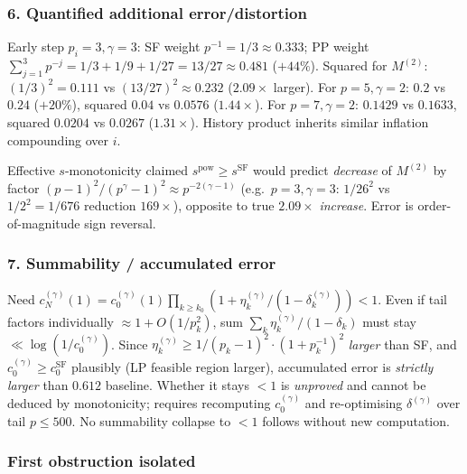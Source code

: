 \documentclass[11pt,a4paper]{article}
\theoremstyle{plain}
\theoremstyle{definition}
\theoremstyle{remark}
\newcommand{\cN}{c_{N}}
\newcommand{\cO}{c_{0}}
\begin{document}
\subsubsection*{6. Quantified additional error/distortion}

Early step $p_{i}=3,\gamma=3$: SF weight $p^{-1}=1/3\approx0.333$; PP weight $\sum_{j=1}^{3}p^{-j}=1/3+1/9+1/27=13/27\approx0.481$ ($+44\%$). Squared for $M^{(2)}$: $(1/3)^{2}=0.111$ vs $(13/27)^{2}\approx0.232$ ($2.09\times$ larger). For $p=5,\gamma=2$: $0.2$ vs $0.24$ ($+20\%$), squared $0.04$ vs $0.0576$ ($1.44\times$). For $p=7,\gamma=2$: $0.1429$ vs $0.1633$, squared $0.0204$ vs $0.0267$ ($1.31\times$). History product inherits similar inflation compounding over $i$.

Effective $s$-monotonicity claimed $s^{\mathrm{pow}}\ge s^{\mathrm{SF}}$ would predict \emph{decrease} of $M^{(2)}$ by factor $(p-1)^{2}/(p^{\gamma}-1)^{2}\approx p^{-2(\gamma-1)}$ (e.g.\ $p=3,\gamma=3$: $1/26^{2}$ vs $1/2^{2}=1/676$ reduction $169\times$), opposite to true $2.09\times$ \emph{increase}. Error is order-of-magnitude sign reversal.

\subsubsection*{7. Summability / accumulated error}

Need $\cN^{(\gamma)}(1)=\cO^{(\gamma)}(1)\prod_{k\ge k_{0}}(1+\eta_{k}^{(\gamma)}/(1-\delta_{k}^{(\gamma)}))<1$. Even if tail factors individually $\approx1+O(1/p_{k}^{2})$, sum $\sum_{k}\eta_{k}^{(\gamma)}/(1-\delta_{k})$ must stay $\ll\log(1/\cO^{(\gamma)})$. Since $\eta_{k}^{(\gamma)}\ge1/(p_{k}-1)^{2}\cdot(1+p_{k}^{-1})^{2}$ \emph{larger} than SF, and $\cO^{(\gamma)}\ge\cO^{\mathrm{SF}}$ plausibly (LP feasible region larger), accumulated error is \emph{strictly larger} than $0.612$ baseline. Whether it stays $<1$ is \emph{unproved} and cannot be deduced by monotonicity; requires recomputing $\cO^{(\gamma)}$ and re-optimising $\delta^{(\gamma)}$ over tail $p\le500$. No summability collapse to $<1$ follows without new computation.

\subsubsection*{First obstruction isolated}
\end{document}
